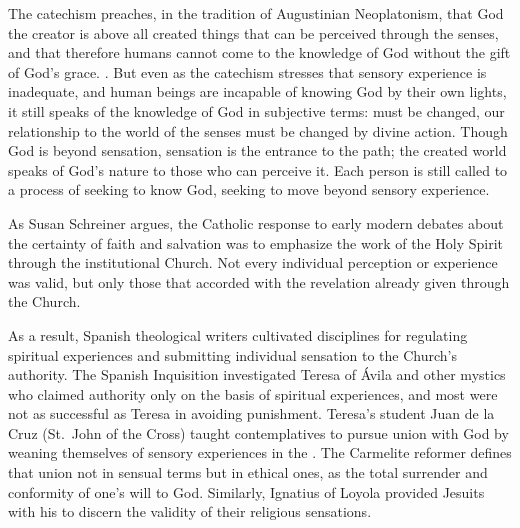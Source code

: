 The catechism preaches, in the tradition of Augustinian Neoplatonism, that God the creator is above all created things that can be perceived through the senses, and that therefore humans cannot come to the knowledge of God without the gift of God's grace.
.%
    \Autocite
    [18: .]
    {Catholic:Catechismus1614}
But even as the catechism stresses that sensory experience is inadequate, and human beings are incapable of knowing God by their own lights, it still speaks of the knowledge of God in subjective terms:  must be changed, our relationship to the world of the senses must be changed by divine action.
Though God is beyond sensation, sensation is the entrance to the path; the created world speaks of God's nature to those who can perceive it.
Each person is still called to a process of seeking to know God, seeking to move beyond sensory experience.

As Susan Schreiner argues, the Catholic response to early modern debates about the certainty of faith and salvation was to emphasize the work of the Holy Spirit through the institutional Church.%
    \Autocite[\XXX]{Schreiner:Certainty}
Not every individual perception or experience was valid, but only those that accorded with the revelation already given through the Church.

As a result, Spanish theological writers cultivated disciplines for regulating spiritual experiences and submitting individual sensation to the Church's authority.
The Spanish Inquisition investigated Teresa of Ávila and other mystics who claimed authority only on the basis of spiritual experiences, and most were not as successful as Teresa in avoiding punishment.%
    \Autocites{Ahlgren:TeresaPolitics}{Francisca:Inquisition}
Teresa's student Juan de la Cruz (St.\ John of the Cross) taught contemplatives to pursue union with God by weaning themselves of sensory experiences in the .
The Carmelite reformer defines that union not in sensual terms but in ethical ones, as the total surrender and conformity of one's will to God.%
    \Autocite[bk.~I, ch.~5--7, 226--248]{JuandelaCruz:Subida}
Similarly, Ignatius of Loyola provided Jesuits with his  to discern the validity of their religious sensations.%
    \Autocite[ch.~6]{Schreiner:Certainty}

